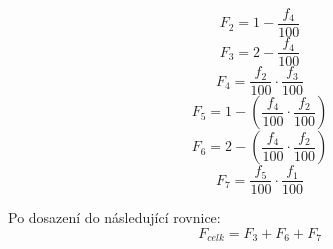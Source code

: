 \begin{equation}
    \label{eqn:1_calculation_5_1}
    F_2 = 1 - \frac{f_4}{100}
\end{equation}
\begin{equation}
    \label{eqn:2_calculation_5_1}
    F_3 = 2 - \frac{f_4}{100}
\end{equation}
\begin{equation}
    \label{eqn:3_calculation_5_1}
    F_4 = \frac{f_2}{100} \cdot \frac{f_3}{100}
\end{equation}
\begin{equation}
    \label{eqn:4_calculation_5_1}
    F_5 = 1 - (\frac{f_4}{100} \cdot \frac{f_2}{100})
\end{equation}
\begin{equation}
    \label{eqn:5_calculation_5_1}
    F_6 = 2 - (\frac{f_4}{100} \cdot \frac{f_2}{100})
\end{equation}
\begin{equation}
    \label{eqn:6_calculation_5_1}
    F_7 = \frac{f_5}{100} \cdot \frac{f_1}{100}
\end{equation}

\noindent Po dosazení do následující rovnice:
\begin{equation}
    \label{eqn:7_calculation_5_1}
    F_{celk} = F_3 + F_6 + F_7
\end{equation}

